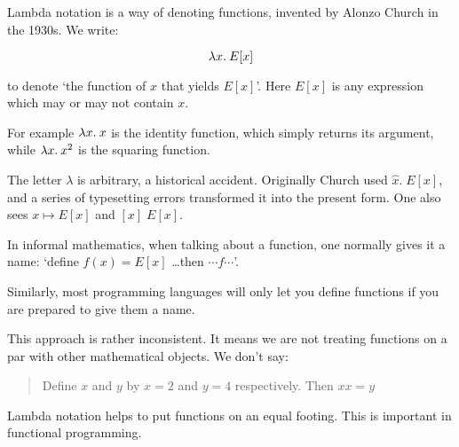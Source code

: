 \begin{slide*}

\vspace*{0.5cm}


Lambda notation is a way of denoting functions, invented by Alonzo Church in
the 1930s. We write:

{\red $$ \lambda x.\: E[x] $$ }

to denote `the function of {\red $x$} that yields {\red $E[x]$}'. Here {\red
$E[x]$} is any expression which may or may not contain {\red $x$}.

For example {\red $\lambda x.\: x$} is the identity function, which simply returns
its argument, while {\red $\lambda x.\: x^2$} is the squaring function.

The letter {\red $\lambda$} is arbitrary, a historical accident. Originally
Church used {\red $\hat{x}.\; E[x]$}, and a series of typesetting errors
transformed it into the present form. One also sees {\red $x \mapsto E[x]$}
and {\red $[x]\; E[x]$}.

\end{slide*}


\begin{slide*}

\vspace*{1.0cm}


In informal mathematics, when talking about a function, one normally gives it a
name: `define {\red $f(x) = E[x]$} \ldots then {\red $\cdots f \cdots$}'.

Similarly, most programming languages will only let you define functions if you
are prepared to give them a name.

This approach is rather inconsistent. It means we are not treating functions on
a par with other mathematical objects. We don't say:

\begin{quote}
Define {\red $x$} and {\red $y$} by {\red $x = 2$} and {\red $y = 4$}
respectively. Then {\red $x x = y$}
\end{quote}

Lambda notation helps to put functions on an equal footing. This is important
in functional programming.

\end{slide*}



